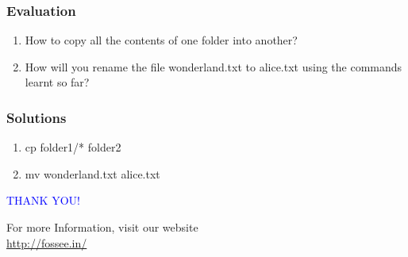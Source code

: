 \documentclass[12pt,compress]{beamer}
\begin{document}
\begin{frame}[fragile]
\frametitle{Evaluation}
\label{sec-9}


\begin{enumerate}
\item How to copy all the contents of one folder into another?
\vspace{15pt}
\item How will you rename the file wonderland.txt to alice.txt using the 
      commands learnt so far? 
\end{enumerate}
\end{frame}
\begin{frame}
\frametitle{Solutions}
\label{sec-10}


\begin{enumerate}
\item cp folder1/* folder2 
\vspace{15pt}
\item mv wonderland.txt alice.txt
\end{enumerate}
\end{frame}
\begin{frame}

  \begin{block}{}
  \begin{center}
  \textcolor{blue}{\Large THANK YOU!} 
  \end{center}
  \end{block}
\begin{block}{}
  \begin{center}
    For more Information, visit our website\\
    \url{http://fossee.in/}
  \end{center}  
  \end{block}
\end{frame}
\end{document}
